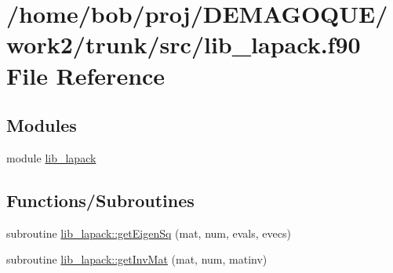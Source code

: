 \hypertarget{lib__lapack_8f90}{
\section{/home/bob/proj/DEMAGOQUE/work2/trunk/src/lib\_\-lapack.f90 File Reference}
\label{lib__lapack_8f90}
}
\subsection*{Modules}
\begin{DoxyCompactItemize}
\item 
module \hyperlink{namespacelib__lapack}{lib\_\-lapack}
\end{DoxyCompactItemize}
\subsection*{Functions/Subroutines}
\begin{DoxyCompactItemize}
\item 
subroutine \hyperlink{namespacelib__lapack_a68a92047afc9e2ab7248d36406c53a0b}{lib\_\-lapack::getEigenSq} (mat, num, evals, evecs)
\item 
subroutine \hyperlink{namespacelib__lapack_a807f49d6f736971f5ee0eadce0af94eb}{lib\_\-lapack::getInvMat} (mat, num, matinv)
\end{DoxyCompactItemize}
